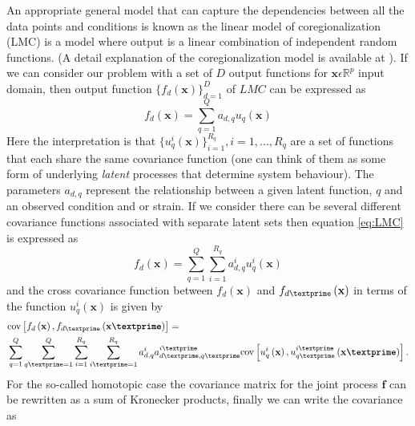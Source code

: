 An appropriate general model that can capture the dependencies between all the data points and conditions is known as the linear model of coregionalization (LMC) is a model where output is a linear combination of independent random functions. 
(A detail explanation of the coregionalization model is available at 
\cite{Alvarez:2011, Alvarez:2012}). If we can consider 
our problem with a set of $D$ output functions for $\textbf{x}\epsilon\mathbb{R}^p$ input domain, then
output function $\{ f_d\left(\textbf{x}\right)\}^D_{d=1}$ of $LMC$ can be expressed as
\begin{equation} \label{eq:LMC}
f_d\left(\textbf{x}\right)=\sum\limits_{q=1}^Q a_{d,q}u_q\left(\textbf{x}\right)
\end{equation}
Here the interpretation is that $\{u_q^i\left(\textbf{x}\right)\}^{R_q}_{i=1}, i= 1,..., R_q$ are a set of functions that each share the
same covariance function (one can think of them as some form of underlying \emph{latent} processes that determine system behaviour). The parameters $a_{d, q}$ represent the relationship between a given latent function, $q$ and an observed condition and or strain. If we consider there can be several different covariance functions associated with separate latent sets then equation \ref{eq:LMC} is expressed as
\begin{equation} \label{eq:LMClatent}
f_d\left(\textbf{x}\right)=\sum\limits_{q=1}^Q \sum\limits_{i=1}^{R_q} a^i_{d,q}u^i_q\left(\textbf{x}\right)
\end{equation}
and the cross covariance function between $f_d\left(\textbf{x}\right)$ and 
$f_{d\textprime}\left(\textbf{x}\right)$ in terms of the function $u^i_q\left(\textbf{x}\right)$
is given by
\begin{equation} \label{eq:LMCcov}
\begin{split}
&\text{cov} \left[ f_d\left(\textbf{x}\right), f_{d\textprime}\left(\textbf{x\textprime}\right)\right]=\\
&\sum\limits_{q=1}^Q \sum\limits_{q\textprime=1}^Q \sum\limits_{i=1}^{R_q} \sum\limits_{i\textprime=1}^{R_q}
a^i_{d,q}a^{i\textprime}_{d\textprime,q\textprime} 
\text{cov} \left[ u^i_q\left(\textbf{x}\right),u^{i\textprime}_{q\textprime}\left(\textbf{x\textprime}\right) \right].
\end{split}
\end{equation}
For the so-called homotopic case \cite{Alvarez:2011, Wackernagel:2003} the
covariance matrix for the joint process $\textbf{f}$ can be rewritten
as a sum of Kronecker products, finally we can write the covariance as
